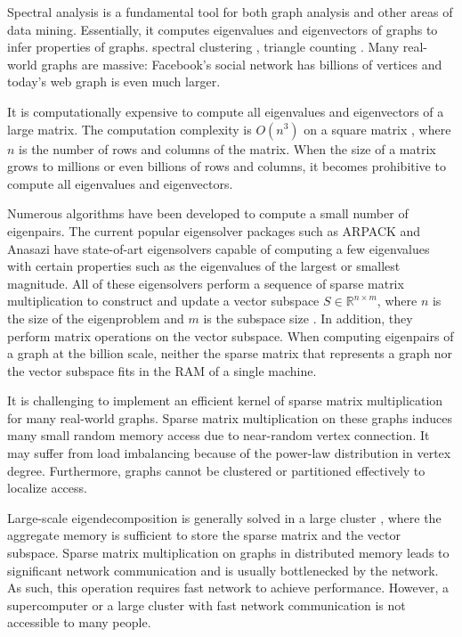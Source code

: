 Spectral analysis \cite{} is a fundamental tool for both graph analysis and
other areas of data mining. Essentially, it computes
eigenvalues and eigenvectors of graphs to infer properties of graphs.
spectral clustering \cite{Ng01, Sussman12}, triangle counting \cite{Tsourakakis08}.
Many real-world graphs are massive: Facebook's social network has billions
of vertices and today's web graph is even much larger.


It is computationally expensive to compute all eigenvalues and
eigenvectors of a large matrix. The computation complexity is
$O(n^3)$ on a square matrix \cite{Pan99}, where $n$ is the number of rows
and columns of the matrix.
When the size of a matrix grows to millions or even billions of rows and
columns, it becomes prohibitive to compute all eigenvalues and
eigenvectors.

Numerous algorithms \cite{Lanczos, IRLM, krylovschur, Arbenz05} have been
developed to compute a small number of eigenpairs.
The current popular eigensolver packages such as ARPACK \cite{arpack}
and Anasazi \cite{anasazi} have state-of-art eigensolvers
capable of computing a few eigenvalues with certain properties such as
the eigenvalues of the largest or smallest magnitude. All of these eigensolvers
perform a sequence of sparse matrix multiplication to construct and update
a vector subspace $S \in \mathbb{R}^{n \times m}$, where $n$ is the size of
the eigenproblem and $m$ is the subspace size \cite{Arbenz05}. In addition,
they perform matrix operations on the vector subspace. When computing eigenpairs
of a graph at the billion scale, neither the sparse matrix that represents
a graph nor the vector subspace fits in the RAM of a single machine.

It is challenging to implement an efficient kernel of sparse matrix
multiplication for many real-world graphs. Sparse matrix multiplication
on these graphs induces many small random memory access due to near-random
vertex connection. It may suffer from load imbalancing because of
the power-law distribution in vertex degree. Furthermore, graphs cannot be
clustered or partitioned effectively \cite{Leskovec} to localize access.

Large-scale eigendecomposition is generally solved in a large cluster
\cite{anasazi, slepc}, where the aggregate memory is sufficient to store
the sparse matrix and the vector subspace. Sparse matrix multiplication
on graphs in distributed memory leads to significant network communication
and is usually bottlenecked by the network. As such, this operation requires
fast network to achieve performance. However, a supercomputer or a large
cluster with fast network communication is not accessible to many people.

